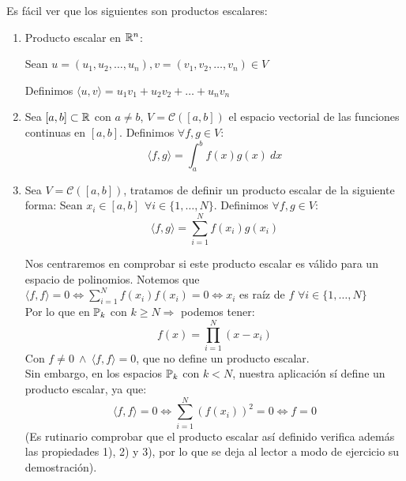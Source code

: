 \begin{ejemplo}Es fácil ver que los siguientes son productos escalares:
\begin{enumerate}
    \item Producto escalar en $\mathbb R^n$:

    Sean $u = (u_1, u_2, \ldots, u_n), v=(v_1, v_2, \ldots, v_n) \in V$

    Definimos $\langle u,v\rangle = u_1 v_1 + u_2 v_2 + \ldots + u_n v_n$

    \item Sea $[a,b] \subset \mathbb R$ con $a \neq b$, $V=\mathcal{C}([a,b])$ el espacio vectorial de las funciones continuas en $[a,b]$.
    Definimos $\forall f,g \in V$:
    $$\langle f,g\rangle = \int_a^b f(x)g(x)~dx$$

    \item Sea $V=\mathcal{C}([a,b])$, tratamos de definir un producto escalar de la siguiente forma:
    Sean $x_i \in [a,b]~~\forall i \in \{1, \ldots, N\}$. Definimos $\forall f,g \in V$:
    $$\langle f,g\rangle = \sum_{i=1}^N f(x_i)g(x_i)$$
    
    \noindent
    Nos centraremos en comprobar si este producto escalar es válido para un espacio de polinomios.\newline
    Notemos que $\langle f,f \rangle = 0 \Leftrightarrow \sum\limits_{i=1}^N f(x_i)f(x_i)=0 \Leftrightarrow x_i$ es raíz de $f$
    $\forall i \in \{1, \ldots, N\}$\\
    
    \noindent
    Por lo que en $\mathbb{P}_k$ con $k \geq N \Rightarrow$ podemos tener:
    $$f(x) = \prod_{i=1}^N(x-x_i)$$
    Con $f\neq0 \ \land \ \langle f,f \rangle = 0$, que no define un producto escalar.\\
    
    \noindent
    Sin embargo, en los espacios $\mathbb{P}_k$ con $k < N$, nuestra aplicación sí define un producto escalar, ya que:
    $$\langle f,f \rangle = 0 \Leftrightarrow \sum_{i=1}^N (f(x_i))^2 = 0 \Leftrightarrow f=0$$
    (Es rutinario comprobar que el producto escalar así definido verifica además las propiedades 1), 2) y 3), por lo que se deja
    al lector a modo de ejercicio su demostración).
\end{enumerate}
\end{ejemplo}

\bigskip
